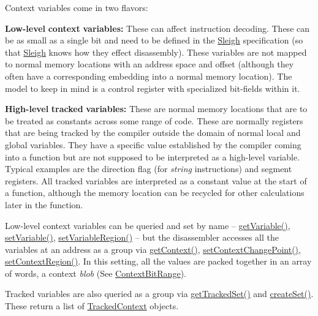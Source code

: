 Context variables come in two flavors\+:
\begin{DoxyItemize}
\item {\bfseries{Low-\/level}} {\bfseries{context}} {\bfseries{variables\+:}} These can affect instruction decoding. These can be as small as a single bit and need to be defined in the \mbox{\hyperlink{class_sleigh}{Sleigh}} specification (so that \mbox{\hyperlink{class_sleigh}{Sleigh}} knows how they effect disassembly). These variables are not mapped to normal memory locations with an address space and offset (although they often have a corresponding embedding into a normal memory location). The model to keep in mind is a control register with specialized bit-\/fields within it.
\item {\bfseries{High-\/level}} {\bfseries{tracked}} {\bfseries{variables\+:}} These are normal memory locations that are to be treated as constants across some range of code. These are normally registers that are being tracked by the compiler outside the domain of normal local and global variables. They have a specific value established by the compiler coming into a function but are not supposed to be interpreted as a high-\/level variable. Typical examples are the direction flag (for {\itshape string} instructions) and segment registers. All tracked variables are interpreted as a constant value at the start of a function, although the memory location can be recycled for other calculations later in the function.
\end{DoxyItemize}

Low-\/level context variables can be queried and set by name -- \mbox{\hyperlink{class_context_database_a1ebd1d177e17c5ea1e877f8b1d8c581d}{get\+Variable()}}, \mbox{\hyperlink{class_context_database_acda111acb02b6fdc598a7e872f002458}{set\+Variable()}}, \mbox{\hyperlink{class_context_database_a567fd374a19fcb9a85ac96e4f2fea27e}{set\+Variable\+Region()}} -- but the disassembler accesses all the variables at an address as a group via \mbox{\hyperlink{class_context_database_a780d39f9c8f7bafe9bbb7eb948d3f9ca}{get\+Context()}}, \mbox{\hyperlink{class_context_database_a58728fefe21b68e5599cddfdb5b59091}{set\+Context\+Change\+Point()}}, \mbox{\hyperlink{class_context_database_adce04fedb87fa51a7511963bdffdd591}{set\+Context\+Region()}}. In this setting, all the values are packed together in an array of words, a context {\itshape blob} (See \mbox{\hyperlink{class_context_bit_range}{Context\+Bit\+Range}}).

Tracked variables are also queried as a group via \mbox{\hyperlink{class_context_database_a6ea1e4b793286c0b1ecbafcc58422339}{get\+Tracked\+Set()}} and \mbox{\hyperlink{class_context_database_aba61e2244e4c12105ed5b45a47720808}{create\+Set()}}. These return a list of \mbox{\hyperlink{struct_tracked_context}{Tracked\+Context}} objects. 

